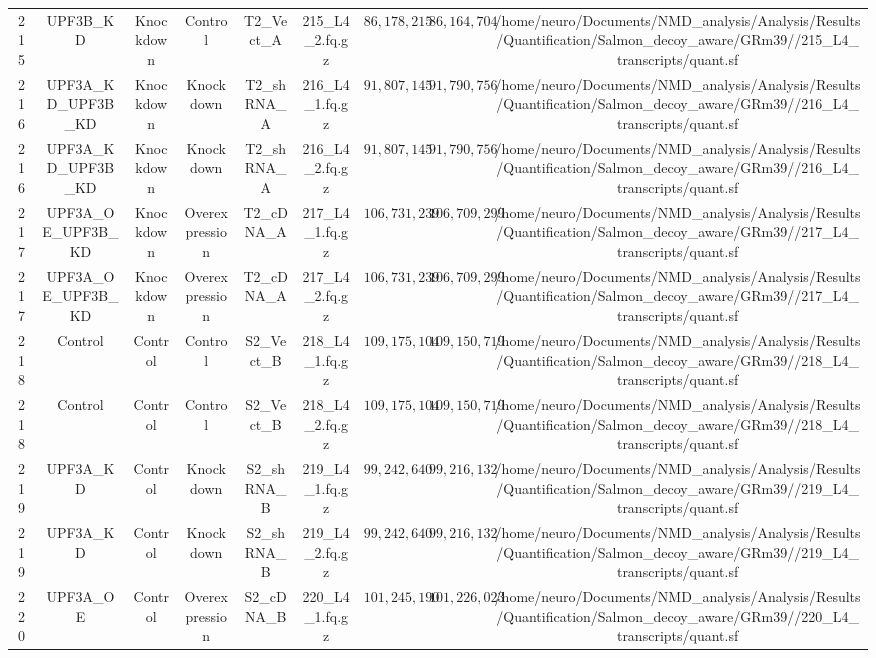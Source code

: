 \begin{table}[!htbp]
\begin{tabular}{@{\extracolsep{5pt}} ccccccccc}
215 & UPF3B\_KD & Knockdown & Control & T2\_Vect\_A & 215\_L4\_2.fq.gz & $86,178,215$ & $86,164,704$ & /home/neuro/Documents/NMD\_analysis/Analysis/Results/Quantification/Salmon\_decoy\_aware/GRm39//215\_L4\_transcripts/quant.sf \\ 
216 & UPF3A\_KD\_UPF3B\_KD & Knockdown & Knockdown & T2\_shRNA\_A & 216\_L4\_1.fq.gz & $91,807,145$ & $91,790,756$ & /home/neuro/Documents/NMD\_analysis/Analysis/Results/Quantification/Salmon\_decoy\_aware/GRm39//216\_L4\_transcripts/quant.sf \\ 
216 & UPF3A\_KD\_UPF3B\_KD & Knockdown & Knockdown & T2\_shRNA\_A & 216\_L4\_2.fq.gz & $91,807,145$ & $91,790,756$ & /home/neuro/Documents/NMD\_analysis/Analysis/Results/Quantification/Salmon\_decoy\_aware/GRm39//216\_L4\_transcripts/quant.sf \\ 
217 & UPF3A\_OE\_UPF3B\_KD & Knockdown & Overexpression & T2\_cDNA\_A & 217\_L4\_1.fq.gz & $106,731,239$ & $106,709,299$ & /home/neuro/Documents/NMD\_analysis/Analysis/Results/Quantification/Salmon\_decoy\_aware/GRm39//217\_L4\_transcripts/quant.sf \\ 
217 & UPF3A\_OE\_UPF3B\_KD & Knockdown & Overexpression & T2\_cDNA\_A & 217\_L4\_2.fq.gz & $106,731,239$ & $106,709,299$ & /home/neuro/Documents/NMD\_analysis/Analysis/Results/Quantification/Salmon\_decoy\_aware/GRm39//217\_L4\_transcripts/quant.sf \\ 
218 & Control & Control & Control & S2\_Vect\_B & 218\_L4\_1.fq.gz & $109,175,104$ & $109,150,719$ & /home/neuro/Documents/NMD\_analysis/Analysis/Results/Quantification/Salmon\_decoy\_aware/GRm39//218\_L4\_transcripts/quant.sf \\ 
218 & Control & Control & Control & S2\_Vect\_B & 218\_L4\_2.fq.gz & $109,175,104$ & $109,150,719$ & /home/neuro/Documents/NMD\_analysis/Analysis/Results/Quantification/Salmon\_decoy\_aware/GRm39//218\_L4\_transcripts/quant.sf \\ 
219 & UPF3A\_KD & Control & Knockdown & S2\_shRNA\_B & 219\_L4\_1.fq.gz & $99,242,640$ & $99,216,132$ & /home/neuro/Documents/NMD\_analysis/Analysis/Results/Quantification/Salmon\_decoy\_aware/GRm39//219\_L4\_transcripts/quant.sf \\ 
219 & UPF3A\_KD & Control & Knockdown & S2\_shRNA\_B & 219\_L4\_2.fq.gz & $99,242,640$ & $99,216,132$ & /home/neuro/Documents/NMD\_analysis/Analysis/Results/Quantification/Salmon\_decoy\_aware/GRm39//219\_L4\_transcripts/quant.sf \\ 
220 & UPF3A\_OE & Control & Overexpression & S2\_cDNA\_B & 220\_L4\_1.fq.gz & $101,245,190$ & $101,226,023$ & /home/neuro/Documents/NMD\_analysis/Analysis/Results/Quantification/Salmon\_decoy\_aware/GRm39//220\_L4\_transcripts/quant.sf \\ 

\end{tabular}
\end{table}
